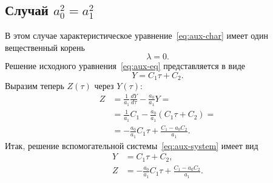 \documentclass[a4paper,14pt]{article}
\begin{document}
\subsection{Случай $a_0^2 = a_1^2$}

В этом случае характеристическое уравнение~\eqref{eq:aux-char}
имеет один вещественный корень
\begin{equation*}
  \lambda = 0.
\end{equation*}
Решение исходного уравнения~\eqref{eq:aux-eq} представляется в
виде
\begin{equation*}
  Y = C_1 \tau + C_2.
\end{equation*}
Выразим теперь $Z(\tau)$ через $Y(\tau)$:
\begin{equation*}
  \begin{aligned}
    Z
    &=
      \frac{1}{a_1} \frac{d Y}{d \tau} - \frac{a_0}{a_1} Y = \\
    &=
      \frac{1}{a_1} C_1
      - \frac{a_0}{a_1} \left(
      C_1 \tau + C_2
      \right) = \\
    &=
      - \frac{a_0}{a_1} C_1 \tau
      + \frac{C_1 - a_0 C_2}{a_1}.
  \end{aligned}
\end{equation*}
Итак, решение вспомогательной системы~\eqref{eq:aux-system}
имеет вид
\begin{equation}
  \begin{aligned}
    Y &= C_1 \tau + C_2, \\
    Z &=
        - \frac{a_0}{a_1} C_1 \tau
        + \frac{C_1 - a_0 C_2}{a_1}.
  \end{aligned}
\end{equation}
\end{document}
